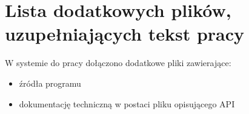 \chapter{Lista dodatkowych plików, uzupełniających tekst pracy} 


W systemie do pracy dołączono dodatkowe pliki zawierające:

\begin{itemize}
\item źródła programu
\item dokumentację techniczną w postaci pliku opisującego API
\end{itemize}
